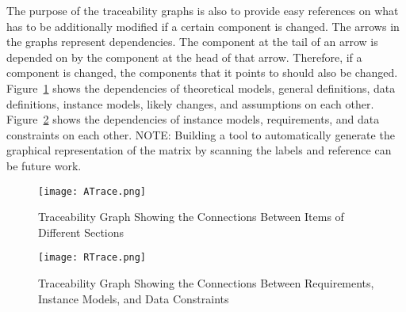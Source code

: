 \documentclass[12pt]{article}
\begin{document}
The purpose of the traceability graphs is also to provide easy references on what has to be additionally modified if a certain component is changed. The arrows in the graphs represent dependencies. The component at the tail of an arrow is depended on by the component at the head of that arrow. Therefore, if a component is changed, the components that it points to should also be changed. Figure~\ref{Figure:TracGrapShowtheConnBetwItemofDiffSect} shows the dependencies of theoretical models, general definitions, data definitions, instance models, likely changes, and assumptions on each other. Figure~\ref{Figure:TracGrapShowtheConnBetwRequInstModeandDataCons} shows the dependencies of instance models, requirements, and data constraints on each other.
NOTE: Building a tool to automatically generate the graphical representation of the matrix by scanning the labels and reference can be future work.
\begin{figure}
\begin{center}
\texttt{[image: ATrace.png]}
\caption{Traceability Graph Showing the Connections Between Items of Different Sections}
\label{Figure:TracGrapShowtheConnBetwItemofDiffSect}
\end{center}
\end{figure}
\begin{figure}
\begin{center}
\texttt{[image: RTrace.png]}
\caption{Traceability Graph Showing the Connections Between Requirements, Instance Models, and Data Constraints}
\label{Figure:TracGrapShowtheConnBetwRequInstModeandDataCons}
\end{center}
\end{figure}
\end{document}
